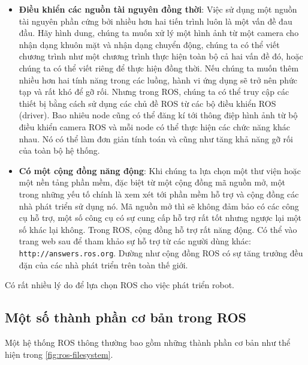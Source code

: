 {\begin{itemize}
	\item \textbf{Điều khiển các nguồn tài nguyên đồng thời}: Việc sử dụng một nguồn tài nguyên phần cứng bởi nhiều hơn hai tiến trình luôn là một vấn đề đau đầu. Hãy hình dung, chúng ta muốn xử lý một hình ảnh từ một camera cho nhận dạng khuôn mặt và nhận dạng chuyển động, chúng ta có thể viết chương trình như một chương trình thực hiện toàn bộ cả hai vấn đề đó, hoặc chúng ta có thể viết riêng để thực hiện đồng thời. Nếu chúng ta muốn thêm nhiều hơn hai tính năng trong các luồng, hành vi ứng dụng sẽ trở nên phức tạp và rất khó để gỡ rối. Nhưng trong ROS, chúng ta có thể truy cập các thiết bị bằng cách sử dụng các chủ đề ROS từ các bộ điều khiển ROS (driver). Bao nhiêu node cũng có thể đăng kí tới thông điệp hình ảnh từ bộ điều khiển camera ROS và mỗi node có thể thực hiện các chức năng khác nhau. Nó có thể làm đơn giản tính toán và cũng như tăng khả năng gỡ rối của toàn bộ hệ thống.
	\item \textbf{Có một cộng đồng năng động}: Khi chúng ta lựa chọn một thư viện hoặc một nền tảng phần mềm, đặc biệt từ một cộng đồng mã nguồn mở, một trong những yếu tố chính là xem xét tới phần mềm hỗ trợ và cộng đồng các nhà phát triển sử dụng nó. Mã nguồn mở thì sẽ không đảm bảo có các công cụ hỗ trợ, một số công cụ có sự cung cấp hỗ trợ rất tốt nhưng ngược lại một số khác lại không. Trong ROS, cộng đồng hỗ trợ rất năng động. Có thể vào trang web sau để tham khảo sự hỗ trợ từ các người dùng khác: {\tt http://answers.ros.org}. Dường như cộng đồng ROS có sự tăng trưởng đều đặn của các nhà phát triển trên toàn thế giới.
\end{itemize}

Có rất nhiều lý do để lựa chọn ROS cho việc phát triển robot.

\subsection{Một số thành phần cơ bản trong ROS}

Một hệ thống ROS thông thường bao gồm những thành phần cơ bản như thể hiện trong \figurename{ \ref{fig:ros-filesystem}}.

\begin{figure}[htbp]
  \centering
\end{figure}}
